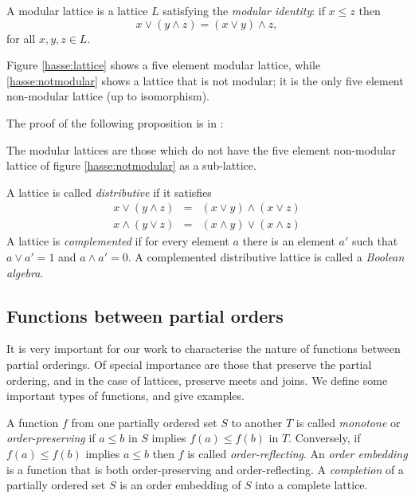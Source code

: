 \begin{defn}[Modularity]
A modular lattice is a lattice $L$ satisfying the \emph{modular identity}: if $x \le z$ then
$$x \lor (y \land z) = (x \lor y) \land z,$$
for all $x,y,z \in L$.
\end{defn}

Figure \ref{hasse:lattice} shows a five element modular lattice, while \ref{hasse:notmodular} shows a lattice that is not modular; it is the only five element non-modular lattice (up to isomorphism).

The proof of the following proposition is in \cite{Birkhoff:48}:
\begin{prop}
The modular lattices are those which do not have the five element non-modular lattice of figure \ref{hasse:notmodular} as a sub-lattice.
\end{prop}

\begin{defn}
A lattice is called \emph{distributive} if it satisfies
\begin{eqnarray*}
x\lor(y\land z) & = & (x\lor y)\land(x\lor z)\\
x\land(y\lor z) & = & (x\land y)\lor(x\land z)
\end{eqnarray*}
A lattice is \emph{complemented} if for every element $a$ there is an element $a'$ such that $a \lor a' = 1$ and $a \land a' = 0$. A complemented distributive lattice is called a \emph{Boolean algebra}.
\end{defn}

\subsection{Functions between partial orders}

It is very important for our work to characterise the nature of functions between partial orderings. Of special importance are those that preserve the partial ordering, and in the case of lattices, preserve meets and joins. We define some important types of functions, and give examples.

\begin{defn}
A function $f$ from one partially ordered set $S$ to another $T$ is called \emph{monotone} or \emph{order-preserving} if $a \le b$ in $S$ implies $f(a) \le f(b)$ in $T$. Conversely, if $f(a) \le f(b)$ implies $a \le b$ then $f$ is called \emph{order-reflecting}. An \emph{order embedding} is a function that is both order-preserving and order-reflecting. A \emph{completion} of a partially ordered set $S$ is an order embedding of $S$ into a complete lattice.
\end{defn}

